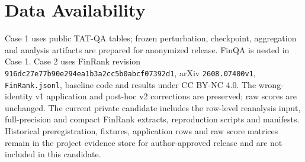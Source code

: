 \documentclass[10pt,conference]{IEEEtran}
\begin{document}
\section{Data Availability}
Case 1 uses public TAT-QA tables; frozen perturbation, checkpoint, aggregation and analysis artifacts are prepared for anonymized release. FinQA is nested in Case 1. Case 2 uses FinRank revision \texttt{916dc27e77b90e294ea1b3a2cc5b0abcf07392d1}, arXiv \texttt{2608.07400v1}, \texttt{FinRank.jsonl}, baseline code and results under CC BY-NC 4.0. The wrong-identity v1 application and post-hoc v2 corrections are preserved; raw scores are unchanged. The current private candidate includes the row-level reanalysis input, full-precision and compact FinRank extracts, reproduction scripts and manifests. Historical preregistration, fixtures, application rows and raw score matrices remain in the project evidence store for author-approved release and are not included in this candidate.


\end{document}
